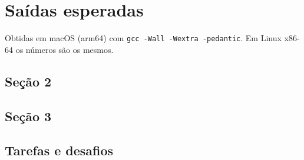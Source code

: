 \documentclass[11pt,a4paper]{article}
\begin{document}
\appendix
\section{Saídas esperadas}\label{ap:saidas}

\noindent Obtidas em macOS (arm64) com \texttt{gcc -Wall -Wextra -pedantic}.
Em Linux x86-64 os números são os mesmos.

\subsection*{Seção 2}


\subsection*{Seção 3}


\subsection*{Tarefas e desafios}




\end{document}
